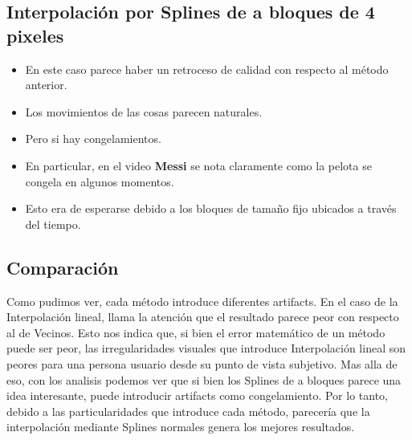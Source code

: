 \subsection{Interpolación por Splines de a bloques de 4 pixeles}

\begin{itemize}
\item En este caso parece haber un retroceso de calidad con respecto al método anterior.
\item Los movimientos de las cosas parecen naturales.
\item Pero si hay congelamientos.
\item En particular, en el video \textbf{Messi} se nota claramente como la pelota se congela en algunos momentos.
\item Esto era de esperarse debido a los bloques de tamaño fijo ubicados a través del tiempo.
\end{itemize}

\subsection{Comparación}

Como pudimos ver, cada método introduce diferentes artifacts. En el caso de la Interpolación lineal, llama la atención que el resultado parece peor con respecto al de Vecinos. Esto nos indica que, si bien el error matemático de un método puede ser peor, las irregularidades visuales que introduce Interpolación lineal son peores para una persona usuario desde su punto de vista subjetivo.
Mas alla de eso, con los analisis podemos ver que si bien los Splines de a bloques parece una idea interesante, puede introducir artifacts como congelamiento. Por lo tanto, debido a las particularidades que introduce cada método, parecería que la interpolación mediante Splines normales genera los mejores resultados.
